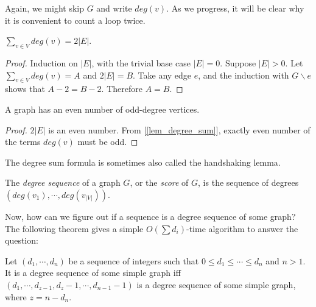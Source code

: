         Again, we might skip $G$ and write $deg(v)$. As we progress, it will be clear why it is convenient to count a loop twice.
        
        \begin{lemma} \label{lem_degree_sum}
            $\sum_{v \in V}deg(v) = 2|E|$.
        \end{lemma}
        
        \begin{proof}
            Induction on $|E|$, with the trivial base case $|E| = 0$. Suppose $|E| > 0$. Let $\sum_{v \in V}deg(v) = A$ and $2|E| = B$. Take any edge $e$, and the induction with $G\backslash e$ shows that $A-2 = B-2$. Therefore $A=B$.
        \end{proof}
        
        \begin{lemma}
            A graph has an even number of odd-degree vertices.
        \end{lemma}
        
        \begin{proof}
            $2|E|$ is an even number. From [\ref{lem_degree_sum}], exactly even number of the terms $deg(v)$ must be odd.
        \end{proof}
        
        The degree sum formula is sometimes also called the handshaking lemma.
        
        \begin{defn} \label{def_graph_score}
            The \emph{degree sequence} of a graph $G$, or the \emph{score} of $G$, is the sequence of degrees $(deg(v_1),\cdots,deg(v_{|V|}))$.
        \end{defn}
        
        Now, how can we figure out if a sequence is a degree sequence of some graph? The following theorem gives a simple $O(\sum d_i)$-time algorithm to answer the question:
        
        \begin{thm} \label{thm_havel_hakimi}
            Let $(d_1,\cdots,d_n)$ be a sequence of integers such that $0 \leq d_1 \leq \cdots \leq d_n$ and $n>1$. It is a degree sequence of some simple graph iff $(d_1,\cdots,d_{z-1},d_z-1,\cdots,d_{n-1}-1)$ is a degree sequence of some simple graph, where $z = n-d_n$.
        \end{thm}
        
